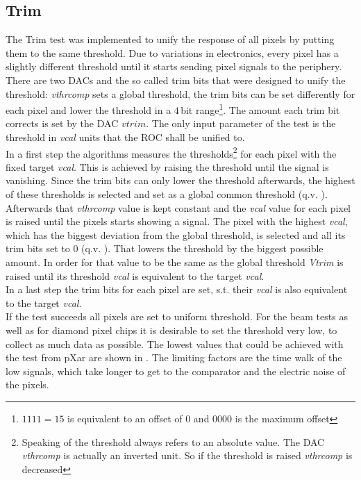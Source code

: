 \subsection{Trim}\label{strim}
The Trim test was implemented to unify the response of all pixels by putting them to the same threshold. Due to variations in electronics, every pixel has a slightly different threshold until it starts sending pixel signals to the periphery.\\
There are two \ac{DAC}s and the so called trim bits that were designed to unify the threshold: \textit{vthrcomp} sets a global threshold, the trim bits can be set differently for each pixel and lower the threshold in a $4\,$bit range\footnote{$1111=15$ is equivalent to an offset of $0$ and $0000$ is the maximum offset}. The amount each trim bit corrects is set by the \ac{DAC} $vtrim$. The only input parameter of the test is the threshold in \textit{vcal} units that the \ac{ROC} shall be unified to.\\
In a first step the algorithms measures the thresholds\footnote{Speaking of the threshold always refers to an absolute value. The \ac{DAC} \textit{vthrcomp} is actually an inverted unit. So if the threshold is raised \textit{vthrcomp} is decreased} for each pixel with the fixed target \textit{vcal}. This is achieved by raising the threshold until the signal is vanishing. Since the trim bits can only lower the threshold afterwards, the highest of these thresholds is selected and set as a global common threshold (q.v. ).\\
Afterwards that \textit{vthrcomp} value is kept constant and the \textit{vcal} value for each pixel is raised until the pixels starts showing a signal. The pixel with the highest \textit{vcal}, which has the biggest deviation from the global threshold, is selected and all its trim bits set to $0$ (q.v. ). That lowers the threshold by the biggest possible amount. In order for that value to be the same as the global threshold \textit{Vtrim} is raised until its threshold \textit{vcal} is equivalent to the target  \textit{vcal}.\\
In a last step the trim bits for each pixel are set, s.t. their \textit{vcal} is also equivalent to the target \textit{vcal}.\\
If the test succeeds all pixels are set to uniform threshold. For the beam tests as well as for diamond pixel chips it is desirable to set the threshold very low, to collect as much data as possible. The lowest values that could be achieved with the test from pXar are shown in . The limiting factors are the time walk of the low signals, which take longer to get to the comparator and the electric noise of the pixels.
